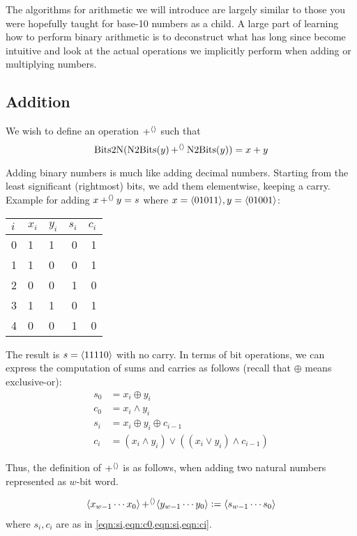 The algorithms for arithmetic we will introduce are largely similar to
those you were hopefully taught for base-10 numbers as a child.  A
large part of learning how to perform binary arithmetic is to
deconstruct what has long since become intuitive and look at the
actual operations we implicitly perform when adding or multiplying
numbers.

\subsection{Addition}
\label{sec:bit-addition}

We wish to define an operation $\operatorname{+^{\langle\rangle}}$ such that
\begin{equation}
  \mathrm{Bits2N}(\mathrm{N2Bits}(y)\operatorname{+^{\langle\rangle}}{}\mathrm{N2Bits}(y)) = x + y
\end{equation}

Adding binary numbers is much like adding decimal numbers.  Starting
from the least significant (rightmost) bits, we add them elementwise,
keeping a carry.  Example for adding $x\operatorname{+^{\langle\rangle}}{} y=s$ where
$x=\langle 01011 \rangle, y=\langle 01001 \rangle$:

\begin{center}
\begin{tabular}{l|llrr}
  $i$ & $x_{i}$ & $y_{i}$ & $s_{i}$ & $c_{i}$ \\\hline
  0 & 1 & 1 & 0 & 1 \\
  1 & 1 & 0 & 0 & 1 \\
  2 & 0 & 0 & 1 & 0 \\
  3 & 1 & 1 & 0 & 1 \\
  4 & 0 & 0 & 1 & 0
\end{tabular}
\end{center}

The result is $s=\langle 11110 \rangle$ with no carry.  In terms of bit
operations, we can express the computation of sums and carries as
follows (recall that $\oplus$ means exclusive-or):
\begin{align}
  s_{0} &= x_{i} \oplus y_{i} \label{eqn:s0} \\
  c_{0} &= x_{i} \land y_{i} \label{eqn:c0} \\
  s_{i} &= x_{i} \oplus y_{i} \oplus c_{i-1} \label{eqn:si} \\
  c_{i} &= (x_{i} \land y_{i})\lor ((x_{i}\lor y_{i})\land c_{i-1}) \label{eqn:ci}
\end{align}

Thus, the definition of $\operatorname{+^{\langle\rangle}}$ is as follows, when adding two
natural numbers represented as $w$-bit word.
\begin{definition}
\begin{align*}
  \langle x_{w-1}\cdots{}x_{0} \rangle \operatorname{+^{\langle\rangle}} \langle y_{w-1}\cdots{}y_{0} \rangle \vcentcolon=
  \langle s_{w-1}\cdots{}s_{0} \rangle
\end{align*}
where $s_{i},c_{i}$ are as in \cref{eqn:si,eqn:c0,eqn:si,eqn:ci}.
\label{def:intadd}
\end{definition}

